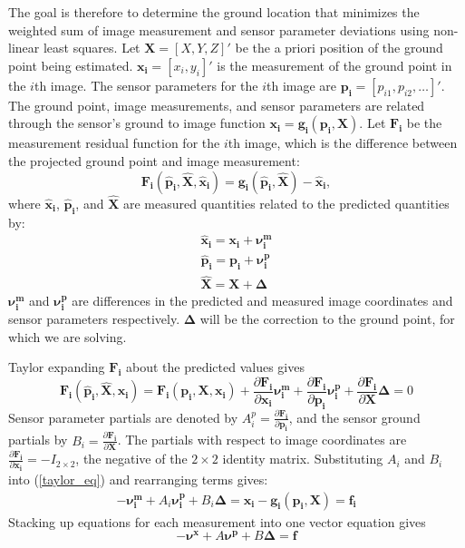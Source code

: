 \documentclass[10pt]{amsart}
\newcommand{\imgmeashat}{\pmb{\hat{x}_{i}}}
\newcommand{\imgmeas}{\pmb{x_{i}}}
\newcommand{\grndhat}{\pmb{\hat{X}}}
\newcommand{\grnd}{\pmb{X}}
\newcommand{\sensmeashat}{\pmb{\hat{p}_i}}
\newcommand{\sensmeas}{\pmb{p_i}}
\newcommand{\imgnu}{\pmb{\nu_{i}^m}}
\newcommand{\sensnu}{\pmb{\nu_i^p}}
\newcommand{\grndupdate}{\pmb{\Delta}}
\newcommand{\Fimgpartials}{\frac{\partial{\pmb{F_{i}}}}{\partial{\imgmeas}}}
\newcommand{\Fgrndpartials}{\frac{\partial{\pmb{F_{i}}}}{\partial{\grnd}}}
\newcommand{\Fsenspartials}{\frac{\partial{\pmb{F_{i}}}}{\partial{\sensmeas}}}
\begin{document}
The goal is therefore to determine the ground location that minimizes the weighted
sum of image measurement and sensor parameter deviations using non-linear least
squares. Let $\grnd = [X, Y, Z]'$ be the a priori position of the ground point
being estimated.  $\imgmeas = [x_{i}, y_{i}]'$ is the measurement of the ground
point in the $i$th image.  The sensor parameters for the $i$th image are
$\sensmeas = [p_{i1}, p_{i2}, \ldots]'$. The ground point, image measurements,
and sensor parameters are related through the sensor's ground to image function
$\imgmeas = \pmb{g_i}(\sensmeas, \grnd)$.  Let $\pmb{F_{i}}$ be the measurement
residual function for the $i$th image, which is the difference between the
projected ground point and image measurement:
\begin{equation*}
\pmb{F_{i}}(\sensmeashat, \grndhat,\imgmeashat)=\pmb{g_i}(\sensmeashat,\grndhat)-\imgmeashat,
\end{equation*}
where $\imgmeashat$, $\sensmeashat$, and $\grndhat$ are measured quantities
related to the predicted quantities by:
\begin{equation*}
\begin{split}
\imgmeashat = \imgmeas + \imgnu\\
\sensmeashat    = \sensmeas + \sensnu\\
\grndhat    = \grnd + \grndupdate
\end{split}
\end{equation*}
$\imgnu$ and $\sensnu$ are differences in the predicted and measured image
coordinates and sensor parameters respectively.  $\grndupdate$ will be the
correction to the ground point, for which we are solving.

Taylor expanding $\pmb{F_{i}}$ about the predicted values gives
\begin{equation} \label{taylor_eq}
\pmb{F_{i}}(\sensmeashat, \grndhat, \imgmeashat) = 
\pmb{F_{i}}(\sensmeas, \grnd, \imgmeas) + \Fimgpartials\imgnu + \Fsenspartials\sensnu + \Fgrndpartials\grndupdate = 0
\end{equation}
Sensor parameter partials are denoted by $A_{i}^p = \Fsenspartials$, and the
sensor ground partials by $B_{i} = \Fgrndpartials$.  The partials with respect
to image coordinates are ${\Fimgpartials=-I_{2 \times 2}}$, the negative of the
$2 \times 2$ identity matrix.  Substituting $A_{i}$ and $B_{i}$ into
(\ref{taylor_eq}) and rearranging terms gives:
\begin{equation} \label{linear_eq}
\begin{split}
-\imgnu + A_{i}\sensnu + B_{i}\grndupdate = \imgmeas - \pmb{g_i}(\sensmeas, \grnd) = \pmb{f_{i}}
\end{split}
\end{equation}
Stacking up equations for each measurement into one vector equation gives
\begin{equation}\label{stacked_eq}
-\pmb{\nu^x} + A\pmb{\nu^p} + B\grndupdate = \pmb{f}
\end{equation}
\end{document}
